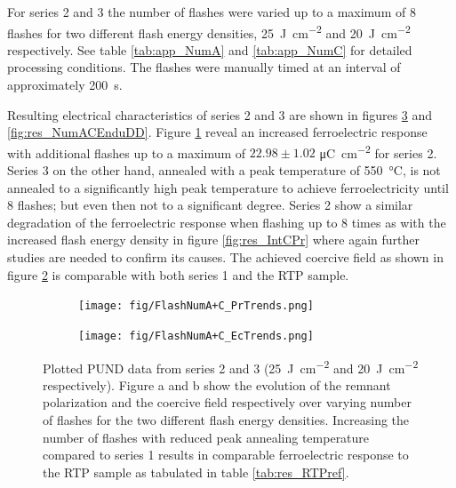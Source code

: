 \documentclass[11pt,twoside,final]{eitExjobb}  %
\begin{document}
For series 2 and 3 the number of flashes were varied up to a
maximum of 8 flashes for two different flash energy densities,
\SI{25}{\joule\per\centi\meter\squared} and
\SI{20}{\joule\per\centi\meter\squared} respectively. See table
\ref{tab:app_NumA} and \ref{tab:app_NumC} for detailed processing conditions.
The flashes were manually timed at an interval of approximately
\SI{200}{\second}.

Resulting electrical characteristics of series 2 and 3 are shown in
figures \ref{fig:res_NumACPUND} and \ref{fig:res_NumACEnduDD}. Figure
\ref{fig:res_NumACPr} reveal an increased ferroelectric response with
additional flashes up to a maximum of $22.98 \pm 1.02$
\si{\micro\coulomb\per\centi\meter\squared} for series 2. Series 3
on the other hand, annealed with a peak temperature of \SI{550}{\celsius}, is
not annealed to a significantly high peak temperature to
achieve ferroelectricity until 8 flashes; but even then not to a significant
degree. Series 2 show a similar degradation of the ferroelectric response
when flashing up to 8 times as with the increased flash energy density in figure
\ref{fig:res_IntCPr} where again further studies are needed to confirm its
causes. The achieved coercive field as shown in figure \ref{fig:res_NumACEc}
is comparable with both series 1 and the RTP sample.

\begin{figure}[htbp]
    \centering
    \begin{subfigure}{.4\linewidth}
        \texttt{[image: fig/FlashNumA+C\_PrTrends.png]}
        \caption{}\label{fig:res_NumACPr}
    \end{subfigure}
    \begin{subfigure}{.4\linewidth}
        \texttt{[image: fig/FlashNumA+C\_EcTrends.png]}
        \caption{}\label{fig:res_NumACEc}    
    \end{subfigure}
    \caption{Plotted PUND data from series 2 and 3
        (\SI{25}{\joule\per\centi\meter\squared} and
        \SI{20}{\joule\per\centi\meter\squared} respectively). Figure a and b show the
    evolution of the remnant polarization and the coercive field respectively
    over varying number of flashes for the two different flash energy densities.
    Increasing the number of flashes with reduced peak annealing temperature
    compared to series 1 results in comparable ferroelectric response to the
    RTP sample as tabulated in table \ref{tab:res_RTPref}.}\label{fig:res_NumACPUND}
\end{figure}
\end{document}
